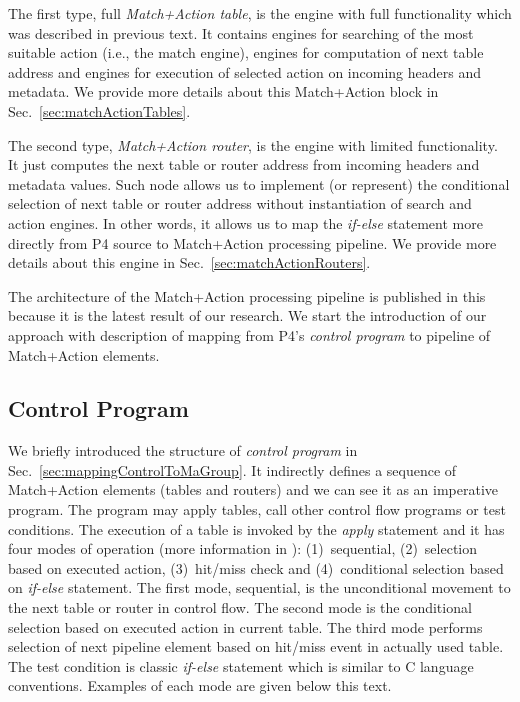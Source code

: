 The first type, full \textit{Match+Action table}, is the engine with full functionality which was described in
previous text. It contains engines for searching of the most suitable action (i.e., the match engine), engines for computation of next table address and
engines for execution of selected action on incoming headers and metadata. We provide more details about this Match+Action block in 
Sec.~\ref{sec:matchActionTables}.

The second type, \textit{Match+Action router}, is the engine with limited functionality. It just computes
the next table or router address from incoming headers and metadata values. Such node allows us to implement (or represent) 
the conditional selection of next table or router address without instantiation of search and action engines. 
In other words, it allows us to map the \textit{if-else} statement more directly from P4 source to Match+Action processing pipeline.
We provide more details about this engine in Sec.~\ref{sec:matchActionRouters}. 

The architecture of the Match+Action processing pipeline is published in this \thesis{} because it is the latest result of our research.
We start the introduction of our approach with description of mapping from P4's \emph{control program} to pipeline of Match+Action elements.

\subsection{Control Program}
\label{sec:matchActionProgram}
We briefly introduced the structure of \emph{control program} in Sec.~\ref{sec:mappingControlToMaGroup}. 
It indirectly defines a sequence of Match+Action elements (tables and routers) and we can see it as an imperative program. 
The program may apply tables, call other control flow programs or test conditions. 
The execution of a table is invoked by the \textit{apply} statement and it has four modes of operation (more information in \cite{p4languagespec}):
(1)~sequential, (2)~selection based on executed action, (3)~hit/miss check and (4)~conditional selection based on \textit{if-else} statement.
The first mode, sequential, is the unconditional movement to the next table or router in control flow.
The second mode is the conditional selection based on executed action in current table.
The third mode performs selection of next pipeline element based on hit/miss event in actually used table.
The test condition is classic \textit{if-else} statement which is similar to C language conventions.
Examples of each mode are given below this text.

